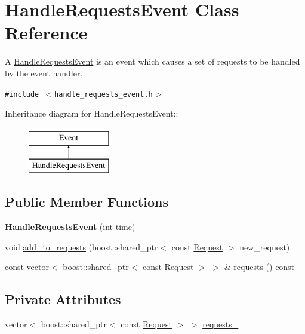 \hypertarget{class_handle_requests_event}{
\section{HandleRequestsEvent Class Reference}
\label{class_handle_requests_event}
}
A \hyperlink{class_handle_requests_event}{HandleRequestsEvent} is an event which causes a set of requests to be handled by the event handler.  


{\tt \#include $<$handle\_\-requests\_\-event.h$>$}

Inheritance diagram for HandleRequestsEvent::\begin{figure}[H]
\begin{center}
\leavevmode
\includegraphics[height=2cm]{class_handle_requests_event}
\end{center}
\end{figure}
\subsection*{Public Member Functions}
\begin{CompactItemize}
\item 
\hypertarget{class_handle_requests_event_02097b7eb6a26773b12fcc6ec7be7335}{
\textbf{HandleRequestsEvent} (int time)}
\label{class_handle_requests_event_02097b7eb6a26773b12fcc6ec7be7335}

\item 
void \hyperlink{class_handle_requests_event_9d8db560c776cba3f19050f8a0b58ce3}{add\_\-to\_\-requests} (boost::shared\_\-ptr$<$ const \hyperlink{class_request}{Request} $>$ new\_\-request)
\item 
const vector$<$ boost::shared\_\-ptr$<$ const \hyperlink{class_request}{Request} $>$ $>$ \& \hyperlink{class_handle_requests_event_a03318f80549212e2023cdab01c9f924}{requests} () const 
\end{CompactItemize}
\subsection*{Private Attributes}
\begin{CompactItemize}
\item 
vector$<$ boost::shared\_\-ptr$<$ const \hyperlink{class_request}{Request} $>$ $>$ \hyperlink{class_handle_requests_event_38fd31bb391f81b55c1ec15de8a4bd00}{requests\_\-}
\end{CompactItemize}


